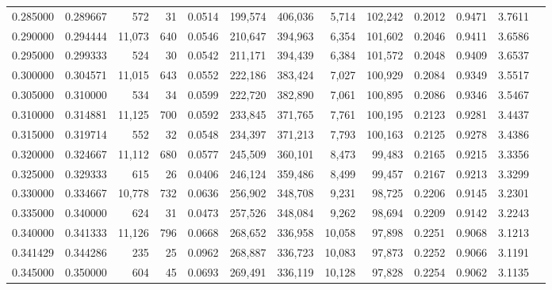 \begin{tabular}{rrrrrrrrrrrrr}
0.285000 & 0.289667 &    572 &    31 &                                     0.0514 & 199,574 & 406,036 &   5,714 & 102,242 & 0.2012 & 0.9471 & 3.7611 \\
0.290000 & 0.294444 & 11,073 &   640 &                                     0.0546 & 210,647 & 394,963 &   6,354 & 101,602 & 0.2046 & 0.9411 & 3.6586 \\
0.295000 & 0.299333 &    524 &    30 &                                     0.0542 & 211,171 & 394,439 &   6,384 & 101,572 & 0.2048 & 0.9409 & 3.6537 \\
0.300000 & 0.304571 & 11,015 &   643 &                                     0.0552 & 222,186 & 383,424 &   7,027 & 100,929 & 0.2084 & 0.9349 & 3.5517 \\
0.305000 & 0.310000 &    534 &    34 &                                     0.0599 & 222,720 & 382,890 &   7,061 & 100,895 & 0.2086 & 0.9346 & 3.5467 \\
0.310000 & 0.314881 & 11,125 &   700 &                                     0.0592 & 233,845 & 371,765 &   7,761 & 100,195 & 0.2123 & 0.9281 & 3.4437 \\
0.315000 & 0.319714 &    552 &    32 &                                     0.0548 & 234,397 & 371,213 &   7,793 & 100,163 & 0.2125 & 0.9278 & 3.4386 \\
0.320000 & 0.324667 & 11,112 &   680 &                                     0.0577 & 245,509 & 360,101 &   8,473 &  99,483 & 0.2165 & 0.9215 & 3.3356 \\
0.325000 & 0.329333 &    615 &    26 &                                     0.0406 & 246,124 & 359,486 &   8,499 &  99,457 & 0.2167 & 0.9213 & 3.3299 \\
0.330000 & 0.334667 & 10,778 &   732 &                                     0.0636 & 256,902 & 348,708 &   9,231 &  98,725 & 0.2206 & 0.9145 & 3.2301 \\
0.335000 & 0.340000 &    624 &    31 &                                     0.0473 & 257,526 & 348,084 &   9,262 &  98,694 & 0.2209 & 0.9142 & 3.2243 \\
0.340000 & 0.341333 & 11,126 &   796 &                                     0.0668 & 268,652 & 336,958 &  10,058 &  97,898 & 0.2251 & 0.9068 & 3.1213 \\
0.341429 & 0.344286 &    235 &    25 &                                     0.0962 & 268,887 & 336,723 &  10,083 &  97,873 & 0.2252 & 0.9066 & 3.1191 \\
0.345000 & 0.350000 &    604 &    45 &                                     0.0693 & 269,491 & 336,119 &  10,128 &  97,828 & 0.2254 & 0.9062 & 3.1135 \\

\end{tabular}
